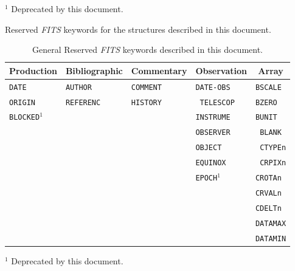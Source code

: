 \begin{table}[htpb]
$^1$ Deprecated by this document.

\caption[Reserved {\em FITS\/} keywords]
         {Reserved {\em FITS\/} keywords for the 
          structures described in this document.}
\end{table}

\begin{table}[htpb]
\begin{center}
\begin{tabular}{lllll} \\ 
\multicolumn{1}{c}{Production} & \multicolumn{1}{c}{Bibliographic} & 
\multicolumn{1}{c}{Commentary} & \multicolumn{1}{c}{Observation}  
& 
\multicolumn{1}{c}{Array} \\ \hline
{\tt DATE}     & {\tt AUTHOR}       & {\tt COMMENT}   & {\tt DATE-OBS}

   & {\tt BSCALE}  

       \\
{\tt ORIGIN}   & {\tt REFERENC}     & {\tt HISTORY}   & {\tt
TELESCOP}     & {\tt BZERO}   

       \\
{\tt BLOCKED}$^{1}$&                    &\verb*+        + & {\tt INSTRUME}     &
{\tt BUNIT}           
\\
               &                    &                 & {\tt OBSERVER}     & {\tt
BLANK}            \\
               &                    &                 & {\tt OBJECT}       & {\tt
CTYPEn}           \\
               &                    &                 & {\tt EQUINOX}      & {\tt
CRPIXn}           \\
               &                    &                 & {\tt EPOCH}$^{1}$ & 
{\tt CROTAn}           \\
               &                    &                 &                    & {\tt CRVALn}    
      \\
               &                    &                 &                    & {\tt CDELTn}   
       \\
               &                    &                 &                    & {\tt DATAMAX} 
        \\
               &                    &                 &                    & {\tt DATAMIN}  
       \\ \hline
\end{tabular}
\end{center}
$^1$ Deprecated by this document.
\caption[General Reserved {\em FITS\/} keywords]
        {General Reserved {\em FITS\/} keywords described in this
document. }
\end{table}

